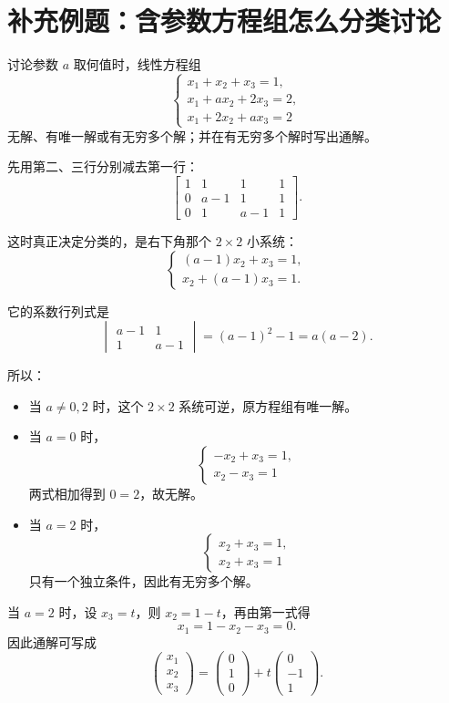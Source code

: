 \documentclass[11pt,oneside,UTF8]{ctexbook}
\begin{document}
\section{补充例题：含参数方程组怎么分类讨论}

\begin{examplebox}
讨论参数 \(a\) 取何值时，线性方程组
\[
\begin{cases}
x_1+x_2+x_3=1,\\
x_1+a x_2+2x_3=2,\\
x_1+2x_2+a x_3=2
\end{cases}
\]
无解、有唯一解或有无穷多个解；并在有无穷多个解时写出通解。

\tcblower

先用第二、三行分别减去第一行：
\[
\left[
\begin{array}{ccc|c}
1&1&1&1\\
0&a-1&1&1\\
0&1&a-1&1
\end{array}
\right].
\]

这时真正决定分类的，是右下角那个 \(2\times 2\) 小系统：
\[
\begin{cases}
(a-1)x_2+x_3=1,\\
x_2+(a-1)x_3=1.
\end{cases}
\]

它的系数行列式是
\[
\begin{vmatrix}
a-1&1\\
1&a-1
\end{vmatrix}
=(a-1)^2-1=a(a-2).
\]

所以：
\begin{itemize}
  \item 当 \(a\neq 0,2\) 时，这个 \(2\times 2\) 系统可逆，原方程组有唯一解。
  \item 当 \(a=0\) 时，
  \[
  \begin{cases}
  -x_2+x_3=1,\\
  x_2-x_3=1
  \end{cases}
  \]
  两式相加得到 \(0=2\)，故无解。
  \item 当 \(a=2\) 时，
  \[
  \begin{cases}
  x_2+x_3=1,\\
  x_2+x_3=1
  \end{cases}
  \]
  只有一个独立条件，因此有无穷多个解。
\end{itemize}

当 \(a=2\) 时，设 \(x_3=t\)，则 \(x_2=1-t\)，再由第一式得
\[
x_1=1-x_2-x_3=0.
\]
因此通解可写成
\[
\begin{pmatrix}
x_1\\x_2\\x_3
\end{pmatrix}
=
\begin{pmatrix}
0\\1\\0
\end{pmatrix}
+
t\begin{pmatrix}
0\\-1\\1
\end{pmatrix}.
\]
\end{examplebox}
\end{document}
